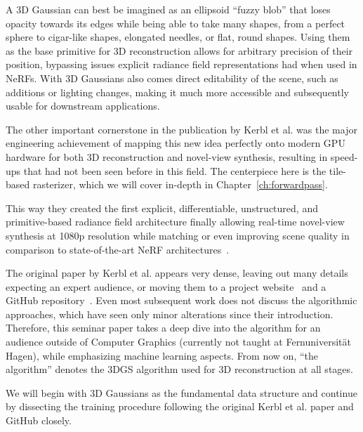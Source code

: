 A 3D Gaussian can best be imagined as an ellipsoid ``fuzzy blob'' that loses opacity towards its edges while being able to take many shapes, from a perfect sphere to cigar-like shapes, elongated needles, or flat, round shapes. Using them as the base primitive for 3D reconstruction allows for arbitrary precision of their position, bypassing issues explicit radiance field representations had when used in NeRFs. With 3D Gaussians also comes direct editability of the scene, such as additions or lighting changes, making it much more accessible and subsequently usable for downstream applications.

The other important cornerstone in the publication by Kerbl et al. was the major engineering achievement of mapping this new idea perfectly onto modern GPU hardware for both 3D reconstruction and novel-view synthesis, resulting in speed-ups that had not been seen before in this field. The centerpiece here is the tile-based rasterizer, which we will cover in-depth in Chapter~\ref{ch:forwardpass}.

This way they created the first explicit, differentiable, unstructured, and primitive-based radiance field architecture finally allowing real-time novel-view synthesis at 1080p resolution while matching or even improving scene quality in comparison to state-of-the-art NeRF architectures~\cite{kerbl3DGaussianSplatting2023}.

The original paper by Kerbl et al. appears very dense, leaving out many details expecting an expert audience, or moving them to a project website~\cite{kerblWebsite} and a GitHub repository~\cite{kerblRepo}.
Even most subsequent work does not discuss the algorithmic approaches, which have seen only minor alterations since their introduction. Therefore, this seminar paper takes a deep dive into the algorithm for an audience outside of Computer Graphics (currently not taught at Fernuniversität Hagen), while emphasizing machine learning aspects. From now on, ``the algorithm'' denotes the 3DGS algorithm used for 3D reconstruction at all stages.

We will begin with 3D Gaussians as the fundamental data structure and continue by dissecting the training procedure following the original Kerbl et al. paper and GitHub closely.